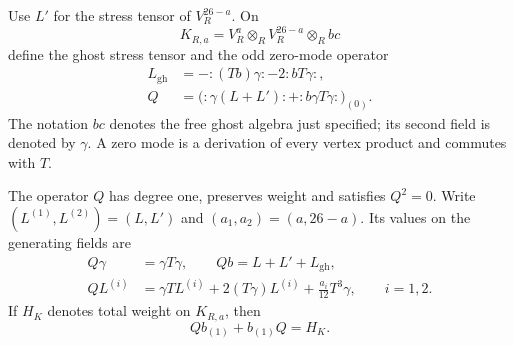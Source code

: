 Use \(L'\) for the stress tensor of \(V_R^{26-a}\).  On
\[
 K_{R,a}=V_R^a\otimes_R V_R^{26-a}\otimes_R bc
\]
define the ghost stress tensor and the odd zero-mode operator
\begin{equation}\label{bv:eq:charge}
 \begin{split}
 L_{\mathrm{gh}}&=-{:}(Tb)\gamma{:}-2{:}bT\gamma{:},\\
 Q&=\bigl({:}\gamma(L+L'){:}+{:}b\gamma T\gamma{:}\bigr)_{(0)}.
 \end{split}
\end{equation}
The notation \(bc\) denotes the free ghost algebra just specified;
its second field is denoted by \(\gamma\).  A zero mode is a
derivation of every vertex product and commutes with \(T\).

\begin{lemma}\label{bv:lem:differential}
The operator \(Q\) has degree one, preserves weight and satisfies
\(Q^2=0\).  Write \((L^{(1)},L^{(2)})=(L,L')\) and
\((a_1,a_2)=(a,26-a)\).  Its values on the generating fields are
\begin{equation}\label{bv:eq:generators}
 \begin{split}
 Q\gamma&=\gamma T\gamma,\qquad
 Qb=L+L'+L_{\mathrm{gh}},\\
 QL^{(i)}&=\gamma TL^{(i)}+2(T\gamma)L^{(i)}+\frac{a_i}{12}T^3\gamma,
 \qquad i=1,2.
 \end{split}
\end{equation}
If \(H_K\) denotes total weight on \(K_{R,a}\), then
\begin{equation}\label{bv:eq:cartan-K}
 Qb_{(1)}+b_{(1)}Q=H_K.
\end{equation}
\end{lemma}

